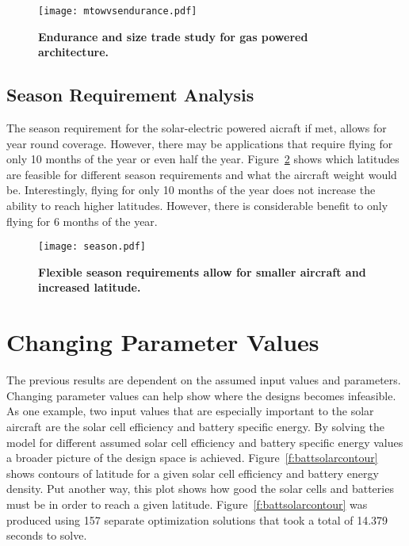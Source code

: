 \begin{figure}[h!]
	\begin{center}
	\texttt{[image: mtowvsendurance.pdf]}
    \caption{\textbf{Endurance and size trade study for gas powered architecture.}}
	\label{f:mtowvsendurance}
	\end{center}
\end{figure}

\subsection{Season Requirement Analysis}

The season requirement for the solar-electric powered aicraft if met, allows for year round coverage.  
However, there may be applications that require flying for only 10 months of the year or even half the year.  
Figure~\ref{f:season} shows which latitudes are feasible for different season requirements and what the aircraft weight would be. 
Interestingly, flying for only 10 months of the year does not increase the ability to reach higher latitudes.  
However, there is considerable benefit to only flying for 6 months of the year.  

\begin{figure}[h!]
	\begin{center}
	\texttt{[image: season.pdf]}
    \caption{\textbf{Flexible season requirements allow for smaller aircraft and increased latitude.}}
	\label{f:season}
	\end{center}
\end{figure}

\section{Changing Parameter Values}

The previous results are dependent on the assumed input values and parameters.  
Changing parameter values can help show where the designs becomes infeasible. 
As one example, two input values that are especially important to the solar aircraft are the solar cell efficiency and battery specific energy. 
By solving the model for different assumed solar cell efficiency and battery specific energy values a broader picture of the design space is achieved.   
Figure~\ref{f:battsolarcontour} shows contours of latitude for a given solar cell efficiency and battery energy density.  
Put another way, this plot shows how good the solar cells and batteries must be in order to reach a given latitude. 
Figure~\ref{f:battsolarcontour} was produced using 157 separate optimization solutions that took a total of 14.379 seconds to solve. 

